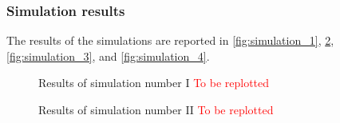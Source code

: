 \subsubsection{Simulation results}
The results of the simulations are reported in \autoref{fig:simulation_1}, \ref{fig:simulation_2}, \ref{fig:simulation_3}, and \ref{fig:simulation_4}. 
\begin{figure}[htb]
  \centering
  \caption{Results of simulation number I \textcolor{red}{To be replotted}}
  \label{fig:simulation_1}
\end{figure}

\begin{figure}[htb]
  \centering
  \caption{Results of simulation number II \textcolor{red}{To be replotted}}
  \label{fig:simulation_2}
\end{figure}

